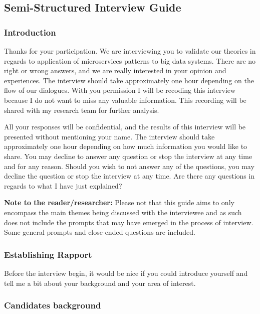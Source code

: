 \documentclass{bmcart}
\begin{document}
\begin{backmatter}

\subsection{Semi-Structured Interview Guide} \label{interviewGuide}

\subsubsection{Introduction}

Thanks for your participation. We are interviewing you to validate our theories in regards to application of microservices patterns to big data systems. There are no right or wrong answers, and we are really interested in your opinion and experiences. The interview should take approximately one hour depending on the flow of our dialogues. With you permission I will be recoding this interview because I do not want to miss any valuable information. This recording will be shared with my research team for further analysis. 

All your responses will be confidential, and the results of this interview will be presented without mentioning your name. The interview should take approximately one hour depending on how much information you would like to share. You may decline to answer any question or stop the interview at any time and for any reason. Should you wish to not answer any of the questions, you may decline the question or stop the interview at any time. Are there any questions in regards to what I have just explained?

\hspace{2cm}

\textbf{Note to the reader/researcher:} Please not that this guide aims to only encompass the main themes being discussed with the interviewee and as such does not include the prompts that may have emerged in the process of interview. Some general prompts and close-ended questions are included.


\subsubsection{\textbf{Establishing Rapport}}

Before the interview begin, it would be nice if you could introduce yourself and tell me a bit about your background and your area of interest. 

\subsubsection{\textbf{Candidates background}}


\end{backmatter}
\end{document}
